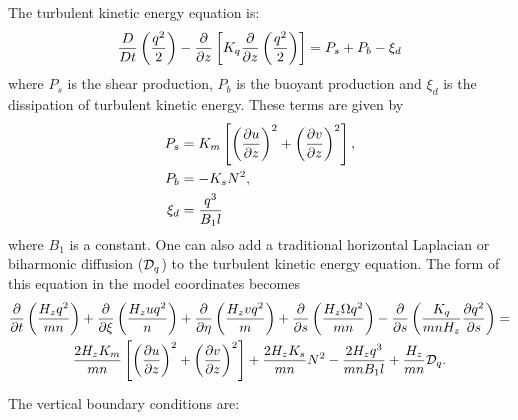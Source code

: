 The turbulent kinetic energy equation is:
\begin{equation}
  {D \over Dt} \left( {q^2 \over 2} \right) -
  {\partial \over \partial z} \left[ K_q {\partial \over \partial z} 
  \left( {q^2 \over 2} \right) \right] = P_s + P_b - \xi_d
  \label{eq:tke1}
\end{equation}
where $P_s$ is the shear production, $P_b$ is the buoyant production
and $\xi_d$ is the dissipation of turbulent kinetic energy. 
These terms are given by
\begin{align}
   P_s &= K_m \left[ \left( {\partial u \over \partial z }\right)^2 +
   \left( {\partial v \over \partial z} \right)^2 \right],  \\
   P_b &= -K_s N^2, \\
   \xi_d &= {q^3 \over B_1 l}
\end{align}
where $B_1$ is a constant.
One can also add a traditional horizontal Laplacian or biharmonic
diffusion (${\cal D}_q$) to the turbulent kinetic energy equation.
The form of this equation in the model coordinates becomes
\begin{multline}
  {\partial \over \partial t} \left( {H_z q^2 \over mn} \right) +
  {\partial \over \partial \xi} \left( {H_z u q^2 \over n} \right) +
  {\partial \over \partial \eta} \left( {H_z v q^2 \over m} \right) +
  {\partial \over \partial s} \left( {H_z \Omega q^2 \over mn} \right) -
  {\partial \over \partial s} \left( {K_q \over mnH_z}
  {\partial q^2 \over \partial s} \right) =
\\ \vspace{1mm}
  {2H_z K_m \over mn} \left[ \left({\partial u \over \partial z}
  \right)^2 + \left( {\partial v \over \partial z} \right)^2 \right] +
  {2H_z K_s \over mn} N^2 - {2H_z q^3 \over mnB_1 l} +
  {H_z \over mn} {\cal D}_q .
  \label{eq:tke2}
\end{multline}
The vertical boundary conditions are:
